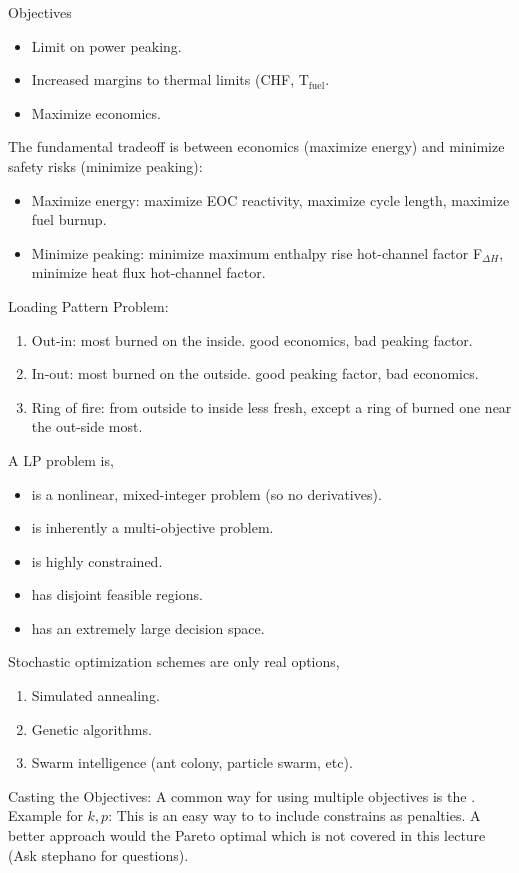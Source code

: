 \documentclass{school-22.211-notes}
\begin{document}
Objectives
\begin{itemize}
\item Limit on power peaking. 
\item Increased margins to thermal limits (CHF, T$_{\mathrm{fuel}}$. 
\item Maximize economics. 
\end{itemize}
The fundamental tradeoff is between economics (maximize energy) and minimize safety risks (minimize peaking):
\begin{itemize}
\item Maximize energy: maximize EOC reactivity, maximize cycle length, maximize fuel burnup. 
\item Minimize peaking: minimize maximum enthalpy rise hot-channel factor F$_{\Delta H}$, minimize heat flux hot-channel factor. 
\end{itemize}


Loading Pattern Problem: 
\begin{enumerate}
\item Out-in: most burned on the inside. good economics, bad peaking factor. 
\item In-out: most burned on the outside. good peaking factor, bad economics.
\item Ring of fire: from outside to inside less fresh, except a ring of burned one near the out-side most. 
\end{enumerate}
A LP problem is, 
\begin{itemize}
\item is a nonlinear, mixed-integer problem (so no derivatives).
\item is inherently a multi-objective problem. 
\item is highly constrained. 
\item has disjoint feasible regions.
\item has an extremely large decision space. 
\end{itemize}
Stochastic optimization schemes are only real options, 
\begin{enumerate}
\item Simulated annealing.
\item Genetic algorithms.
\item Swarm intelligence (ant colony, particle swarm, etc). 
\end{enumerate}
Casting the Objectives: A common way for using multiple objectives is the . Example for $k, p$: 
This is an easy way to to include constrains as penalties. A better approach would the Pareto optimal which is not covered in this lecture (Ask stephano for questions). 
\end{document}
